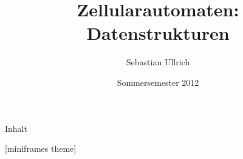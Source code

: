 \documentclass{beamer}
\title{Zellularautomaten: Datenstrukturen}
\author{Sebastian Ullrich}
\date{Sommersemester 2012}
\begin{document}
\newcommand{\ve}[3]{\begin{pmatrix}#1\\#2\\#3\end{pmatrix}}
\newcommand{\vet}[2]{\begin{pmatrix}#1\\#2\end{pmatrix}}

\newcommand{\pop}{\ensuremath{\mathit{pop}}}
\newcommand{\popZiel}{\ensuremath{\mathit{popZiel}}}
\newcommand{\popQuelle}{\ensuremath{\mathit{popQuelle}}}
\newcommand{\nop}{\ensuremath{\mathit{nop}}}
\newcommand{\push}{\ensuremath{\mathit{push}}}
\newcommand{\pushZiel}{\ensuremath{\mathit{pushZiel}}}
\newcommand{\pushQuelle}{\ensuremath{\mathit{pushQuelle}}}
\newcommand{\enqueue}{\ensuremath{\mathit{enqueue}}}
\newcommand{\dequeue}{\ensuremath{\mathit{dequeue}}}

\begin{frame}
    \titlepage
\end{frame}

\begin{frame}{Inhalt}
    \tableofcontents
\end{frame}

[miniframes theme]{}
\end{document}
